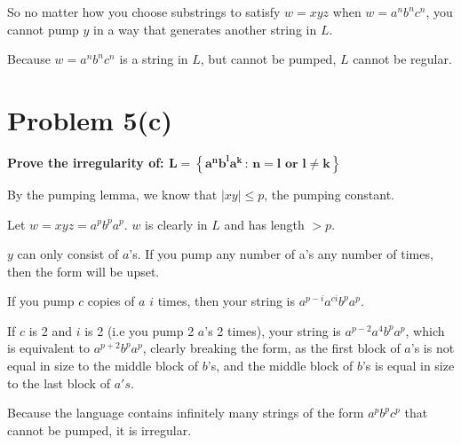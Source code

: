 \documentclass{report}
\begin{document}
So no matter how you choose substrings to satisfy $w = xyz$ when $w = a^n b^n c^n$, you cannot pump $y$ in a way that generates another string in $L$.

Because $w = a^n b^n c^n$ is a string in $L$, but cannot be pumped, $L$ cannot be regular.


\section*{Problem 5(c)}
\textbf{Prove the irregularity of: $\mathbf{L = \left\{a^n b^l a^k \, : \,  n = l \text{ or } l \neq k \right\}}$}


By the pumping lemma, we know that $|xy| \leq p$, the pumping constant.

Let $w = xyz = a^p b^p a^p$. $w$ is clearly in $L$ and has length $> p$.

$y$ can only consist of $a$'s. If you pump any number of a's any number of times, then the form will be upset.

If you pump $c$ copies of $a$ $i$ times, then your string is $a^{p-i} a^{ci} b^p a^p$.

If $c$ is 2 and $i$ is 2 (i.e you pump 2 $a$'s 2 times), your string is $a^{p - 2} a^{4} b^p a^p$, which is equivalent to $a^{p+2} b^p a^p$, clearly breaking the form,
as the first block of $a$'s is not equal in size to the middle block of $b$'s, and the middle block of $b$'s is equal in size to the last block of $a's$.

Because the language contains infinitely many strings of the form $a^p b^p c^p$ that cannot be pumped, it is irregular.







\end{document}
